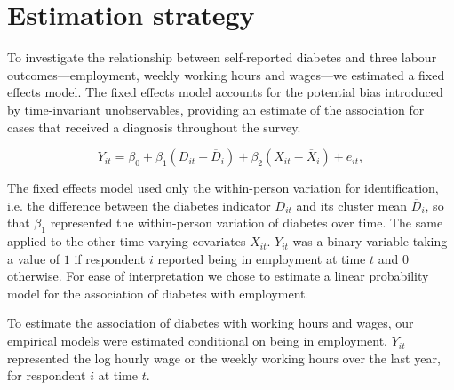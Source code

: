 \documentclass[12pt,english]{article}
\begin{document}

\section{\label{sec:Estimation Strategy}Estimation strategy}

To investigate the relationship between self-reported diabetes and three labour outcomes---employment, weekly working hours and wages---we estimated a fixed effects model. The fixed effects  model accounts for the potential bias introduced by time-invariant unobservables, providing an estimate of the association for cases that received a diagnosis throughout the survey.


\begin{equation}
Y_{it}=\beta_{0}+\beta_{1}(D_{it}-\overline{D}_{i})+\beta_{2}(X_{it}-\overline{X}_i)+e_{it},\label{eq:cha4_employed}
\end{equation}

The fixed effects model used only the  within-person variation for identification, i.e. the difference between the diabetes indicator $D_{it}$ and its cluster mean $\overline{D}_{i}$, so that $\beta_{1}$ represented the within-person variation of diabetes over time. The same applied to the other time-varying covariates $X_{it}$. $Y_{it}$ was a binary variable taking a value of $1$ if respondent $i$ reported being in employment at time $t$ and $0$ otherwise. For ease of interpretation we chose to estimate a linear probability model for the association of diabetes with employment.

To estimate the association of diabetes with working hours and wages, our empirical models were estimated conditional on being in employment. $Y_{it}$ represented the log hourly wage or the weekly working hours over the last year, for respondent $i$ at time $t$.
\end{document}
